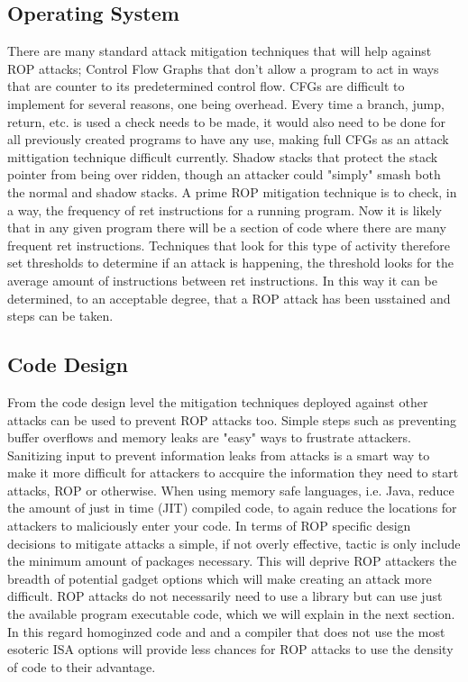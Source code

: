 \documentclass[11pt]{amsart}
\begin{document}
\subsection*{Operating System}
There are many standard attack mitigation techniques that will help against ROP attacks; Control Flow Graphs that don't allow a program to act in ways that are counter to its predetermined control flow.  CFGs are difficult to implement for several reasons, one being overhead.  Every time a branch, jump, return, etc. is used a check needs to be made, it would also need to be done for all previously created programs to have any use, making full CFGs as an attack mittigation technique difficult currently. Shadow stacks that protect the stack pointer from being over ridden, though an attacker could "simply" smash both the normal and shadow stacks.  
A prime ROP mitigation technique is to check, in a way, the frequency of ret instructions for a running program.  Now it is likely that in any given program there will be a section of code where there are many frequent ret instructions.  Techniques that look for this type of activity therefore set thresholds to determine if an attack is happening, the threshold looks for the average amount of instructions between ret instructions.  In this way it can be determined, to an acceptable degree, that a ROP attack has been usstained and steps can be taken.
\subsection*{Code Design}
From the code design level the mitigation techniques deployed against other attacks can be used to prevent ROP attacks too. Simple steps such as preventing buffer overflows and memory leaks are "easy" ways to frustrate attackers.  Sanitizing input to prevent information leaks from attacks is a smart way to make it more difficult for attackers to accquire the information they need to start attacks, ROP or otherwise.  When using memory safe languages, i.e. Java, reduce the amount of just in time (JIT) compiled code, to again reduce the locations for attackers to maliciously enter your code.
In terms of ROP specific design decisions to mitigate attacks a simple, if not overly effective, tactic is only include the minimum amount of packages necessary.  This will deprive ROP attackers the breadth of potential gadget options which will make creating an attack more difficult.  ROP attacks do not necessarily need to use a library but can use just the available program executable code, which we will explain in the next section.  In this regard homoginzed code and and a compiler that does not use the most esoteric ISA options will provide less chances for ROP attacks to use the density of code to their advantage.
\end{document}
